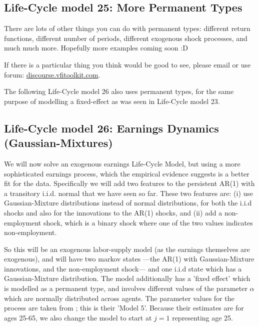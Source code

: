 \subsection{Life-Cycle model 25: More Permanent Types}
There are lots of other things you can do with permanent types: different return functions, different number of periods, different exogenous shock processes, and much much more. Hopefully more examples coming soon :D

If there is a particular thing you think would be good to see, please email or use forum:  \href{http://discourse.vfitoolkit.com/}{discourse.vfitoolkit.com}.

The following Life-Cycle model 26 also uses permanent types, for the same purpose of modelling a fixed-effect as was seen in Life-Cycle model 23.

\subsection{Life-Cycle model 26: Earnings Dynamics (Gaussian-Mixtures)}
We will now solve an exogenous earnings Life-Cycle Model, but using a more sophisticated earnings process, which the empirical evidence suggests is a better fit for the data. Specifically we will add two features to the persistent AR(1) with a transitory i.i.d. normal that we have seen so far. These two features are: (i) use Gaussian-Mixture distributions instead of normal distributions, for both the i.i.d shocks and also for the innovations to the AR(1) shocks, and (ii) add a non-employment shock, which is a binary shock where one of the two values indicates non-employment.

So this will be an exogenous labor-supply model (as the earnings themselves are exogenous), and will have two markov states ---the AR(1) with Gaussian-Mixture innovations, and the non-employment shock--- and one i.i.d state which has a Gaussian-Mixture distribution. The model additionally has a 'fixed effect' which is modelled as a permanent type, and involves different values of the parameter $\alpha$ which are normally distributed across agents. The parameter values for the process are taken from \cite*{GuvenenKarahanOzkanSong2021}; this is their 'Model 5'. Because their estimates are for ages 25-65, we also change the model to start at $j=1$ representing age 25.

